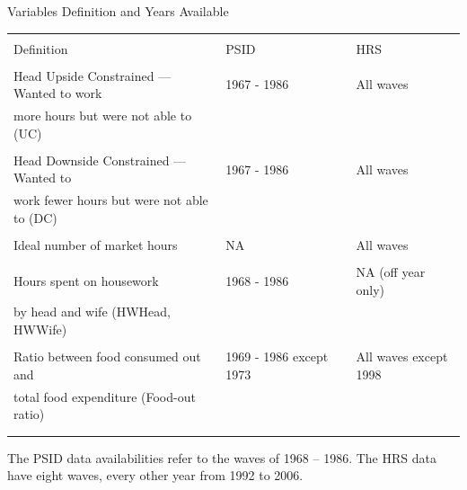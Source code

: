 \begin{center}
\footnotesize
\begin{threeparttable}
\caption{Variables Definition and Years Available} \label{Variable}
\label{Variable}
\begin{tabular}{llll}

\hline\hline \\
Definition                                     &PSID                     &     &HRS                     \\
\hline\hline \\
Head Upside Constrained --- Wanted to work     &1967 - 1986              &     &All waves               \\
more hours but were not able to (UC)           &                         &     &                        \\ \\
Head Downside Constrained --- Wanted to        &1967 - 1986              &     &All waves               \\
work fewer hours but were not able to (DC)     &                         &     &                        \\ \\
Ideal number of market hours                   &NA                       &     &All waves               \\ \\
Hours spent on housework                       &1968 - 1986              &     &NA (off year only)      \\
by head and wife (HWHead, HWWife)              &                         &     &                        \\ \\
Ratio between food consumed out and            &1969 - 1986 except 1973  &     &All waves except 1998   \\
total food expenditure (Food-out ratio)        &                         &     &                        \\ \\
\hline\hline \\[-1ex]
\end{tabular}
\begin{tablenotes}
\item[] \footnotesize{The PSID data availabilities refer to the
waves of 1968 -- 1986.  The HRS data have eight waves, every other
year from 1992 to 2006.}
\end{tablenotes}
\label{var}
\end{threeparttable}
\end{center}


